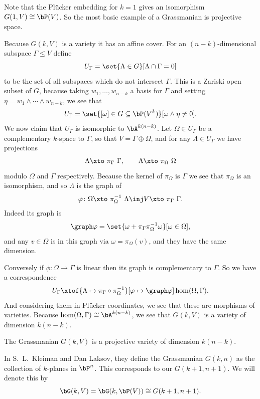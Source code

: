 \bexam

    Note that the Pl\"ucker embedding for $k=1$ gives an isomorphism $G(1,V)\cong\bP(V)$.
    So the most basic example of a Grassmanian is projective space.

\eexam

Because $G(k,V)$ is a variety it has an affine cover.
For an $(n-k)$-dimensional subspace $\Gamma\leq V$ define
$$ U_\Gamma = \set{\Lambda\in G}[\Lambda\cap\Gamma=0] $$
to be the set of all subspaces which do not intersect $\Gamma$.
This is a Zariski open subset of $G$, because taking $w_1,\dots,w_{n-k}$ a basis for $\Gamma$ and
setting $\eta=w_1\wedge\cdots\wedge w_{n-k}$, we see that
$$ U_\Gamma = \set{[\omega]\in G\subseteq\bP(V^k)}[\omega\wedge\eta\neq0] . $$
We now claim that $U_\Gamma$ is isomorphic to $\bA^{k(n-k)}$.
Let $\Omega\in U_\Gamma$ be a complementary $k$-space to $\Gamma$, so that $V=\Gamma\oplus\Omega$,
and for any $\Lambda\in U_\Gamma$ we have projections
$$ \Lambda \xtos{\pi_\Gamma} \Gamma,\qquad \Lambda \xtos{\pi_\Omega} \Omega $$
modulo $\Omega$ and $\Gamma$ respectively.
Because the kernel of $\pi_\Omega$ is $\Gamma$ we see that $\pi_\Omega$ is an isomorphism, and so
$\Lambda$ is the graph of
$$ \phi \colon \Omega \xtos{\pi_\Omega^{-1}} \Lambda \inj V \xtos{\pi_\Gamma} \Gamma . $$
Indeed its graph is
$$ \graph\phi = \set{\omega+\pi_\Gamma\pi_\Omega^{-1}\omega}[\omega\in\Omega] , $$
and any $v\in\Omega$ is in this graph via $\omega=\pi_\Omega(v)$, and they have the same dimension.

Conversely if $\phi\colon\Omega\to\Gamma$ is linear then its graph is complementary to $\Gamma$.
So we have a correspondence
$$ U_\Gamma \xtof{\Lambda\mapsto\pi_\Gamma\circ\pi_\Omega^{-1}}[\phi\mapsto\graph\phi] \hom(\Omega,\Gamma) . $$
And considering them in Pl\"ucker coordinates, we see that these are morphisms of varieties.
Because $\hom(\Omega,\Gamma)\cong\bA^{k(n-k)}$, we see that $G(k,V)$ is a variety of dimension $k(n-k)$.

\bprop

    The Grassmanian $G(k,V)$ is a projective variety of dimension $k(n-k)$.

\eprop

\bnote

    In S.\ L.\ Kleiman and Dan Laksov, they define the Grassmanian $G(k,n)$ as the collection of $k$-planes in
    $\bP^n$.
    This corresponds to our $G(k+1,n+1)$.
    We will denote this by
    $$ \bG(k,V) = \bG(k,\bP(V)) \cong G(k+1,n+1) . $$

\enote

